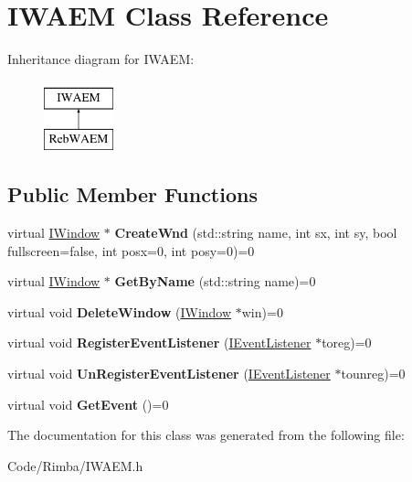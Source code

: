 \hypertarget{class_i_w_a_e_m}{}\section{I\+W\+A\+EM Class Reference}
\label{class_i_w_a_e_m}
Inheritance diagram for I\+W\+A\+EM\+:\begin{figure}[H]
\begin{center}
\leavevmode
\includegraphics[height=2.000000cm]{class_i_w_a_e_m}
\end{center}
\end{figure}
\subsection*{Public Member Functions}
\begin{DoxyCompactItemize}
\item 
virtual \hyperlink{class_i_window}{I\+Window} $\ast$ {\bfseries Create\+Wnd} (std\+::string name, int sx, int sy, bool fullscreen=false, int posx=0, int posy=0)=0\hypertarget{class_i_w_a_e_m_a7708fc1d3a6f839100749d8b5d985ede}{}\label{class_i_w_a_e_m_a7708fc1d3a6f839100749d8b5d985ede}

\item 
virtual \hyperlink{class_i_window}{I\+Window} $\ast$ {\bfseries Get\+By\+Name} (std\+::string name)=0\hypertarget{class_i_w_a_e_m_a180cd608c682ca5a78c1c91c98f12b29}{}\label{class_i_w_a_e_m_a180cd608c682ca5a78c1c91c98f12b29}

\item 
virtual void {\bfseries Delete\+Window} (\hyperlink{class_i_window}{I\+Window} $\ast$win)=0\hypertarget{class_i_w_a_e_m_a9ec07af32081c3e934eeb23fd9f65fb4}{}\label{class_i_w_a_e_m_a9ec07af32081c3e934eeb23fd9f65fb4}

\item 
virtual void {\bfseries Register\+Event\+Listener} (\hyperlink{class_i_event_listener}{I\+Event\+Listener} $\ast$toreg)=0\hypertarget{class_i_w_a_e_m_a74c644610999df689b1fc30abc717fb2}{}\label{class_i_w_a_e_m_a74c644610999df689b1fc30abc717fb2}

\item 
virtual void {\bfseries Un\+Register\+Event\+Listener} (\hyperlink{class_i_event_listener}{I\+Event\+Listener} $\ast$tounreg)=0\hypertarget{class_i_w_a_e_m_acbea005c19162f0236d1496d294f7cf1}{}\label{class_i_w_a_e_m_acbea005c19162f0236d1496d294f7cf1}

\item 
virtual void {\bfseries Get\+Event} ()=0\hypertarget{class_i_w_a_e_m_a310cf816fe820cb7eb261dea912b2a65}{}\label{class_i_w_a_e_m_a310cf816fe820cb7eb261dea912b2a65}

\end{DoxyCompactItemize}


The documentation for this class was generated from the following file\+:\begin{DoxyCompactItemize}
\item 
Code/\+Rimba/I\+W\+A\+E\+M.\+h\end{DoxyCompactItemize}
